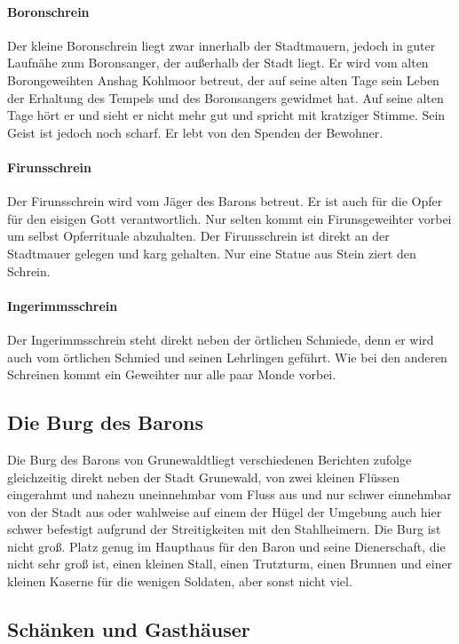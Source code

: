 \paragraph{Boronschrein}
Der kleine Boronschrein liegt zwar innerhalb der Stadtmauern, jedoch in guter Laufnähe zum Boronsanger, der außerhalb der Stadt liegt. Er wird vom alten Borongeweihten Anshag Kohlmoor betreut, der auf seine alten Tage sein Leben der Erhaltung des Tempels und des Boronsangers gewidmet hat. Auf seine alten Tage hört er und sieht er nicht mehr gut und spricht mit kratziger Stimme. Sein Geist ist jedoch noch scharf. Er lebt von den Spenden der Bewohner. 

\paragraph{Firunsschrein}
Der Firunsschrein wird vom Jäger des Barons betreut. Er ist auch für die Opfer für den eisigen Gott verantwortlich. Nur selten kommt ein Firunsgeweihter vorbei um selbst Opferrituale abzuhalten. Der Firunsschrein ist direkt an der Stadtmauer gelegen und karg gehalten. Nur eine Statue aus Stein ziert den Schrein.

\paragraph{Ingerimmsschrein}
Der Ingerimmsschrein steht direkt neben der örtlichen Schmiede, denn er wird auch vom örtlichen Schmied und seinen Lehrlingen geführt. Wie bei den anderen Schreinen kommt ein Geweihter nur alle paar Monde vorbei.

\subsection{Die Burg des Barons}
Die Burg des Barons von Grunewaldtliegt verschiedenen Berichten zufolge gleichzeitig direkt neben der Stadt Grunewald, von zwei kleinen Flüssen eingerahmt und nahezu uneinnehmbar vom Fluss aus und nur schwer einnehmbar von der Stadt aus oder wahlweise auf einem der Hügel der Umgebung auch hier schwer befestigt aufgrund der Streitigkeiten mit den Stahlheimern. Die Burg ist nicht groß. Platz genug im Haupthaus für den Baron und seine Dienerschaft, die nicht sehr groß ist, einen kleinen Stall, einen Trutzturm, einen Brunnen und einer kleinen Kaserne für die wenigen Soldaten, aber sonst nicht viel.

\subsection{Schänken und Gasthäuser}
